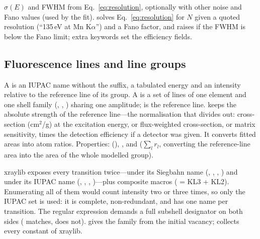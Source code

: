 $\sigma(E)$ and FWHM from Eq.~\eqref{eq:resolution}, optionally with other noise and Fano
values (used by the fit).  solves Eq.~\eqref{eq:resolution} for $N$ given a
quoted resolution (``135\,eV at Mn K$\alpha$'') and a Fano factor, and raises
 if the FWHM is below the Fano limit; extra keywords set the efficiency fields.

\subsection{Fluorescence lines and line groups}\label{sec:lines}

A  is an IUPAC name without the  suffix, a tabulated energy and an
intensity relative to the reference line of its group. A  is a set of lines of
one element and one shell family (, , ) sharing one amplitude;
 is the reference line.  keeps the absolute strength of the
reference line---the normalisation that  divides out: cross-section (cm$^2$/g) at
the excitation energy, or flux-weighted cross-section, or matrix sensitivity, times the
detection efficiency if a detector was given. It converts fitted areas into atom ratios.
Properties:  (), , and  ($\sum_l r_l$,
converting the reference-line area into the area of the whole modelled group).

xraylib exposes every transition twice---under its Siegbahn name (, ,
, ) and under its IUPAC name (, , , )---plus
composite macros ( = KL3 + KL2). Enumerating all of them would count intensity two or
three times, so only the IUPAC set is used: it is complete, non-redundant, and has one name
per transition. The regular expression demands a full subshell designator on both sides
( matches,  does not).  gives the family from the initial
vacancy;  collects every  constant of xraylib.

